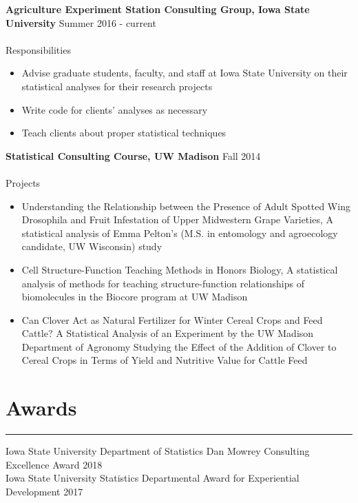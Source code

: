 \documentclass[11pt, oneside]{article}
\begin{document}
\textbf{Agriculture Experiment Station Consulting Group, Iowa State University} Summer 2016 - current\\
\\
Responsibilities
\begin{itemize}
\item Advise graduate students, faculty, and staff at Iowa State University on their statistical analyses for their research projects
\item Write code for clients' analyses as necessary 
\item Teach clients about proper statistical techniques
\end{itemize}

\vspace{0.5cm}

\noindent \textbf{Statistical Consulting Course, UW Madison} \hfill{Fall 2014}\\
\\
Projects
\begin{itemize}
\item Understanding the Relationship between the Presence of Adult Spotted Wing Drosophila and Fruit Infestation of Upper Midwestern Grape Varieties, A statistical analysis of Emma Pelton's (M.S. in entomology and agroecology candidate, UW Wisconsin) study
\item Cell Structure-Function Teaching Methods in Honors Biology, A statistical analysis of methods for teaching structure-function relationships of biomolecules in the Biocore program at UW Madison
\item Can Clover Act as Natural Fertilizer for Winter Cereal Crops and Feed Cattle?
A Statistical Analysis of an Experiment by the UW Madison Department of Agronomy Studying the Effect of the Addition of Clover to Cereal Crops in Terms of Yield and Nutritive Value for Cattle Feed\\
\end{itemize}

\section*{Awards}
\hrule
\vspace{0.5cm}

Iowa State University Department of Statistics Dan Mowrey Consulting Excellence Award \hfill{2018}\\
Iowa State University Statistics Departmental Award for Experiential Development \hfill{2017}
\end{document}
